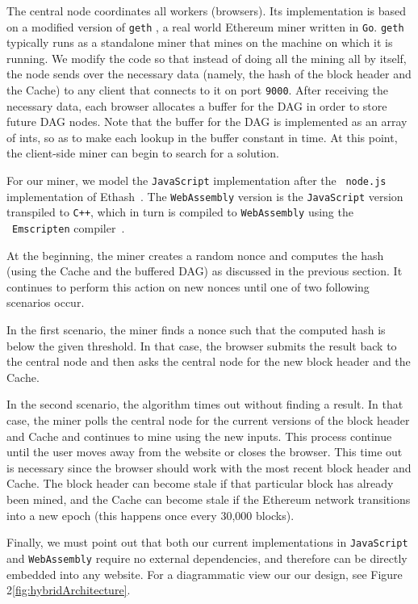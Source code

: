 \documentclass[runningheads]{llncs}
\begin{document}
The central node coordinates all workers (browsers). Its implementation is based on a modified version of \verb|geth| \cite{geth}, a real world Ethereum miner written in \verb|Go|. \verb|geth| typically runs as a standalone miner that mines on the machine on which it is running. We modify the code so that instead of doing all the mining all by itself, the node sends over the necessary data (namely, the hash of the block header and the Cache) to any client that connects to it on port \verb|9000|. After receiving the necessary data, each browser allocates a buffer for the DAG in order to store future DAG nodes. Note that the buffer for the DAG is implemented as an array of ints, so as to make each lookup in the buffer constant in time. At this point, the client-side miner can begin to search for a solution. 

For our miner, we model the \verb|JavaScript| implementation after the ~\verb|node.js| implementation of Ethash~\cite{ethash}. The \verb|WebAssembly| version is the \verb|JavaScript| version transpiled to \verb|C++|, which in turn is compiled to \verb|WebAssembly| using the ~\verb|Emscripten| compiler~\cite{emscripten}. 

At the beginning, the miner creates a random nonce and computes the hash (using the Cache and the buffered DAG) as discussed in the previous section. It continues to perform this action on new nonces until one of two following scenarios occur. 

In the first scenario, the miner finds a nonce such that the computed hash is below the given threshold. In that case, the browser submits the result back to the central node and then asks the central node for the new block header and the Cache. 

In the second scenario, the algorithm times out without finding a result. In that case, the miner polls the central node for the current versions of the block header and Cache and continues to mine using the new inputs. This process continue until the user moves away from the website or closes the browser. 
This time out is necessary since the browser should work with the most recent block header and Cache. The block header can become stale if that particular block has already been mined, and the Cache can become stale if the Ethereum network transitions into a new epoch (this happens once every 30,000 blocks). 

Finally, we must point out that both our current implementations in \verb|JavaScript| and \verb|WebAssembly| require no external dependencies, and therefore can be directly embedded into any website. For a diagrammatic view our our design, see Figure 2\ref{fig:hybridArchitecture}.
\end{document}
